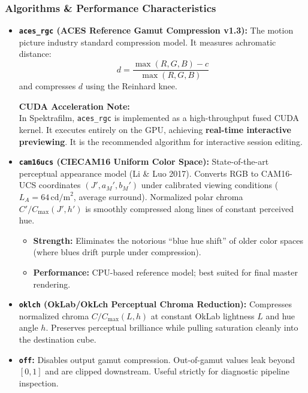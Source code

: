 \documentclass[11pt,a4paper]{article}
\begin{document}
\subsubsection{Algorithms \& Performance Characteristics}
\begin{itemize}[leftmargin=*]
    \item \textbf{\texttt{aces\_rgc} (ACES Reference Gamut Compression v1.3):}
    The motion picture industry standard compression model. It measures achromatic distance:
    \begin{equation}
    d = \frac{\max(R, G, B) - c}{\max(R, G, B)}
    \end{equation}
    and compresses $d$ using the Reinhard knee.
    \begin{tcolorbox}
    \textbf{CUDA Acceleration Note:}\\
    In Spektrafilm, \texttt{aces\_rgc} is implemented as a high-throughput fused CUDA kernel. It executes entirely on the GPU, achieving \textbf{real-time interactive previewing}. It is the recommended algorithm for interactive session editing.
    \end{tcolorbox}

    \item \textbf{\texttt{cam16ucs} (CIECAM16 Uniform Color Space):}
    State-of-the-art perceptual appearance model (Li \& Luo 2017). Converts RGB to CAM16-UCS coordinates $(J', a_M', b_M')$ under calibrated viewing conditions ($L_A = 64\,\text{cd/m}^2$, average surround). Normalized polar chroma $C' / C_{\max}(J', h')$ is smoothly compressed along lines of constant perceived hue.
    \begin{itemize}
        \item \textbf{Strength:} Eliminates the notorious ``blue hue shift'' of older color spaces (where blues drift purple under compression).
        \item \textbf{Performance:} CPU-based reference model; best suited for final master rendering.
    \end{itemize}

    \item \textbf{\texttt{oklch} (OkLab/OkLch Perceptual Chroma Reduction):}
    Compresses normalized chroma $C / C_{\max}(L, h)$ at constant OkLab lightness $L$ and hue angle $h$. Preserves perceptual brilliance while pulling saturation cleanly into the destination cube.

    \item \textbf{\texttt{off}:}
    Disables output gamut compression. Out-of-gamut values leak beyond $[0, 1]$ and are clipped downstream. Useful strictly for diagnostic pipeline inspection.
\end{itemize}
\end{document}
